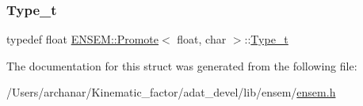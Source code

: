 \subsubsection{\texorpdfstring{Type\_t}{Type\_t}\hspace{0.1cm}{\footnotesize\ttfamily [2/2]}}
{\footnotesize\ttfamily typedef float \mbox{\hyperlink{structENSEM_1_1Promote}{E\+N\+S\+E\+M\+::\+Promote}}$<$ float, char $>$\+::\mbox{\hyperlink{structENSEM_1_1Promote_3_01float_00_01char_01_4_a6bd3d2b4d1e7c3dca5835b3bcaa5be9f}{Type\+\_\+t}}}



The documentation for this struct was generated from the following file\+:\begin{DoxyCompactItemize}
\item 
/\+Users/archanar/\+Kinematic\+\_\+factor/adat\+\_\+devel/lib/ensem/\mbox{\hyperlink{lib_2ensem_2ensem_8h}{ensem.\+h}}\end{DoxyCompactItemize}
